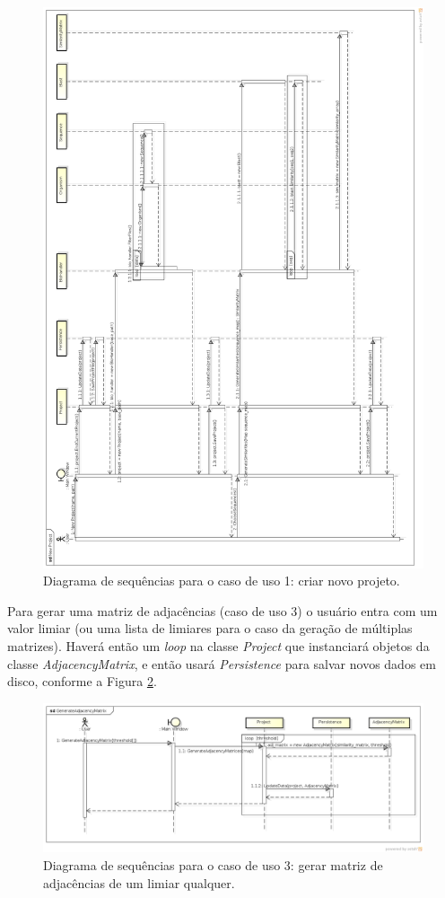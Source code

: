 \begin{figure}
\centering
\includegraphics[scale=0.27]{new-project}
\caption{Diagrama de sequências para o caso de uso 1: criar novo projeto.}
\label{fig:new-project}
\end{figure}

Para gerar uma matriz de adjacências (caso de uso 3)
o usuário entra com um valor limiar (ou uma lista de limiares para o caso da geração de múltiplas matrizes). Haverá
então um \textit{loop} na classe \textit{Project} que instanciará objetos da classe \textit{AdjacencyMatrix}, e então usará \textit{Persistence} para salvar
novos dados em disco, conforme a Figura \ref{fig:generate-adjacency-matrix}.

\begin{figure}
\centering
\includegraphics[scale=0.42]{generate-adjacency-matrix}
\caption{Diagrama de sequências para o caso de uso 3: gerar matriz de adjacências de um limiar qualquer.}
\label{fig:generate-adjacency-matrix}
\end{figure}


